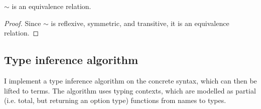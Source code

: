 \begin{theorem}
\(\sim\) is an equivalence relation.
\end{theorem}
\begin{proof}
Since \(\sim\) is reflexive, symmetric, and transitive, it is an equivalence relation.
\end{proof}

\subsection{Type inference algorithm}
\label{sec:type-inference}
I implement a type inference algorithm on the concrete syntax, which can then be lifted to terms.
The algorithm uses typing contexts, which are modelled as partial (i.e. total, but returning an option type) functions from names to types.

